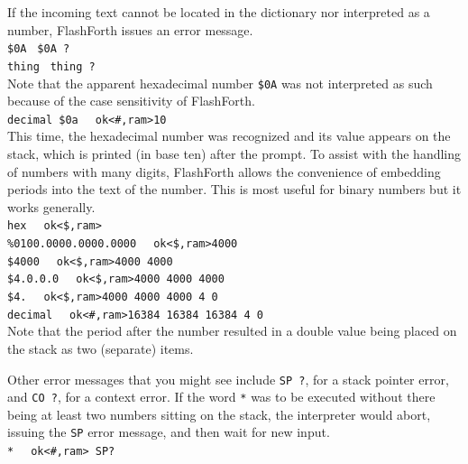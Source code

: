\documentclass[12pt,a4paper]{article}
\begin{document}
\medskip
If the incoming text cannot be located in the dictionary nor interpreted as a number,
FlashForth issues an error message. \vspace{7pt} \\
\verb!$0A! \fbox{$\hookleftarrow$} \verb! $0A ?! \vspace{7pt} \\
\verb!thing! \fbox{$\hookleftarrow$} \verb! thing ?! \vspace{7pt} \\
Note that the apparent hexadecimal number \verb!$0A! was not interpreted as such 
because of the case sensitivity of FlashForth. \vspace{7pt} \\
\verb!decimal $0a! \fbox{$\hookleftarrow$} \verb!  ok<#,ram>10 ! \vspace{7pt} \\
This time, the hexadecimal number was recognized and its value appears on the stack,
which is printed (in base ten) after the prompt.
To assist with the handling of numbers with many digits,
FlashForth allows the convenience of embedding periods into the text of the number.
This is most useful for binary numbers but it works generally. \vspace{7pt} \\
\verb!hex! \fbox{$\hookleftarrow$} \verb!  ok<$,ram> ! \vspace{7pt} \\
\verb!%0100.0000.0000.0000! \fbox{$\hookleftarrow$} \verb!  ok<$,ram>4000 ! \vspace{7pt} \\
\verb!$4000! \fbox{$\hookleftarrow$} \verb!  ok<$,ram>4000 4000 ! \vspace{7pt} \\
\verb!$4.0.0.0! \fbox{$\hookleftarrow$} \verb!  ok<$,ram>4000 4000 4000 ! \vspace{7pt} \\
\verb!$4.! \fbox{$\hookleftarrow$} \verb!  ok<$,ram>4000 4000 4000 4 0 ! \vspace{7pt} \\
\verb!decimal! \fbox{$\hookleftarrow$} \verb!  ok<#,ram>16384 16384 16384 4 0 ! \vspace{7pt} \\
Note that the period after the number resulted in a double value being placed 
on the stack as two (separate) items.

\medskip
Other error messages that you might see include \verb!SP ?!, for a stack pointer error, 
and \verb!CO ?!, for a context error.
If the word \verb!*! was to be executed without there being at least two numbers sitting 
on the stack, the interpreter would abort, issuing the \verb!SP! error message, 
and then wait for new input. \vspace{7pt} \\
\verb!*  ! \fbox{$\hookleftarrow$} \verb!ok<#,ram> SP? ! 
\end{document}
